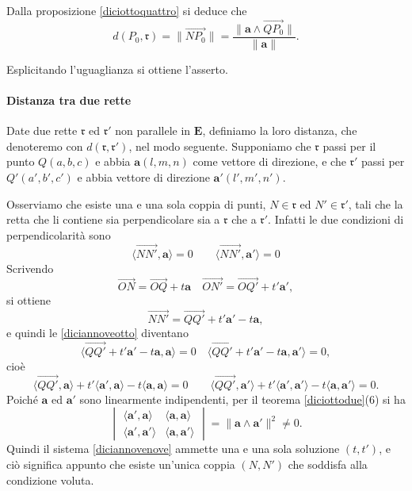 \documentclass{article}
\theoremstyle{plain}
\theoremstyle{definition}
\theoremstyle{remark}
\begin{document}
Dalla proposizione \ref{diciottoquattro} si deduce che
\[
d(P_0, \mathfrak{r}) = \|\overrightarrow{NP_0}\| = \dfrac{\|\mathbf{a} \wedge \overrightarrow{QP_0}\|}{\|\mathbf{a}\|}.
\]

Esplicitando l'uguaglianza si ottiene l'asserto.

\vspace{10pt}

\paragraph{Distanza tra due rette}
Date due rette \(\mathfrak{r}\) ed \(\mathfrak{r}'\) non parallele in \(\mathbf{E}\), definiamo la loro distanza, 
che denoteremo con \(d(\mathfrak{r}, \mathfrak{r}')\), nel modo seguente.
Supponiamo che \(\mathfrak{r}\) passi per il punto \(Q(a, b, c)\) e abbia \(\mathbf{a}(l, m, n)\) come vettore 
di direzione, e che \(\mathfrak{r}'\) passi per \(Q'(a', b', c')\) e abbia vettore di direzione 
\(\mathbf{a}'(l', m', n')\).

Osserviamo che esiste una e una sola coppia di punti, \(N \in \mathfrak{r}\) ed \(N' \in \mathfrak{r}'\), 
tali che la retta che li contiene sia perpendicolare sia a \(\mathfrak{r}\) che a \(\mathfrak{r}'\). 
Infatti le due condizioni di perpendicolarità sono
\begin{equation}\label{diciannoveotto}
\langle \overrightarrow{N N'}, \mathbf{a} \rangle = 0
\quad\quad
\langle \overrightarrow{N N'}, \mathbf{a}' \rangle = 0    
\end{equation}
Scrivendo
\[
\overrightarrow{O N} = \overrightarrow{O Q} + t \mathbf{a}
\quad
\overrightarrow{O N'} = \overrightarrow{O Q'} + t' \mathbf{a}',
\]
si ottiene
\[
\overrightarrow{N N'} = \overrightarrow{Q Q'} + t' \mathbf{a}' - t \mathbf{a},
\]
e quindi le \ref{diciannoveotto} diventano
\[
\langle \overrightarrow{Q Q'} + t' \mathbf{a}' - t \mathbf{a}, \mathbf{a} \rangle = 0
\quad
\langle \overrightarrow{Q Q'} + t' \mathbf{a}' - t \mathbf{a}, \mathbf{a}' \rangle = 0,
\]
cioè
\begin{equation}\label{diciannovenove}
\langle \overrightarrow{Q Q'}, \mathbf{a} \rangle
+ t' \langle \mathbf{a}', \mathbf{a} \rangle
- t \langle \mathbf{a}, \mathbf{a} \rangle = 0\quad\quad
\langle \overrightarrow{Q Q'}, \mathbf{a}' \rangle
+ t' \langle \mathbf{a}', \mathbf{a}' \rangle
- t \langle \mathbf{a}, \mathbf{a}' \rangle = 0.
\end{equation}
Poiché \(\mathbf{a}\) ed \(\mathbf{a}'\) sono linearmente indipendenti, per il teorema \ref{diciottodue}(6) si ha
\[
\begin{vmatrix}
\langle \mathbf{a}', \mathbf{a} \rangle & \langle \mathbf{a}, \mathbf{a} \rangle\\
\langle \mathbf{a}', \mathbf{a}' \rangle & \langle \mathbf{a}, \mathbf{a}' \rangle
\end{vmatrix}
= \|\mathbf{a} \wedge \mathbf{a}'\|^2 \neq 0.
\]
Quindi il sistema \eqref{diciannovenove} ammette una e una sola soluzione \((t, t')\), e ciò significa appunto che 
esiste un'unica coppia \((N, N')\) che soddisfa alla condizione voluta.
\end{document}
